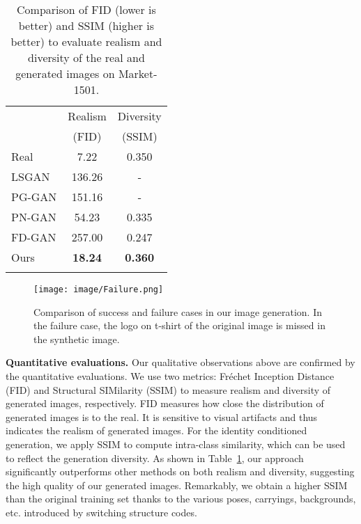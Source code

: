 \documentclass[10pt,twocolumn,letterpaper]{article}
\begin{document}
\begin{table}[tbp]
\vspace{-2.5mm}
\small
\caption{Comparison of FID (lower is better) and SSIM (higher is better) to evaluate realism and diversity of the real and generated images on Market-1501.} 
{
\label{table:visual}
\setlength{\tabcolsep}{15pt}
\begin{tabular}{l|c|c}
\shline
\multirow{2}{*}{Methods} & \multicolumn{1}{c|}{Realism}  & \multicolumn{1}{c}{Diversity}  \\
 & (FID) & (SSIM) \\
\hline
Real & 7.22 & 0.350 \\ \hline
LSGAN \cite{mao2017least} & 136.26 & - \\
PG-GAN \cite{ma2017pose} & 151.16 & - \\
PN-GAN \cite{qian2017pose} & 54.23 & 0.335\\
FD-GAN \cite{ge2018fdgan} & 257.00 &  0.247\\ \hline
Ours & \textbf{18.24} & \textbf{0.360} \\
\shline
\end{tabular}}
\end{table}

\begin{figure}[t]
\vspace{-2.5mm}
\begin{center}
   \texttt{[image: image/Failure.png]}
\end{center}
\vspace{-.2in}
   \caption{Comparison of success and failure cases in our image generation. In the failure case, the logo on t-shirt of the original image is missed in the synthetic image. 
   }
\label{fig:fail}
\end{figure}

\textbf{Quantitative evaluations.}
Our qualitative observations above are confirmed by the quantitative evaluations. We use two metrics: Fr\'echet Inception Distance (FID)\cite{heusel2017gans} and Structural SIMilarity (SSIM) \cite{wang2004image} to measure realism and diversity of generated images, respectively. FID measures how close the distribution of generated images is to the real. It is sensitive to visual artifacts and thus indicates the realism of generated images. For the identity conditioned generation, we apply SSIM to compute intra-class similarity, which can be used to reflect the generation diversity. As shown in Table~\ref{table:visual}, our approach significantly outperforms other methods on both realism and diversity, suggesting the high quality of our generated images. Remarkably, we obtain a higher SSIM than the original training set thanks to the various poses, carryings, backgrounds, etc. introduced by switching structure codes.
\end{document}
